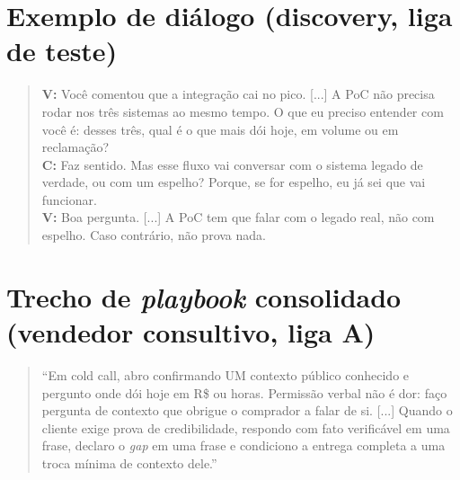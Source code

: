 \documentclass[11pt,a4paper]{article}
\begin{document}
\appendix
\section{Exemplo de diálogo (discovery, liga de teste)}
\small
\begin{quote}
\textbf{V:} Você comentou que a integração cai no pico. [...] A PoC não precisa rodar nos três sistemas ao mesmo tempo. O que eu preciso entender com você é: desses três, qual é o que mais dói hoje, em volume ou em reclamação?\\
\textbf{C:} Faz sentido. Mas esse fluxo vai conversar com o sistema legado de verdade, ou com um espelho? Porque, se for espelho, eu já sei que vai funcionar.\\
\textbf{V:} Boa pergunta. [...] A PoC tem que falar com o legado real, não com espelho. Caso contrário, não prova nada.
\end{quote}

\section{Trecho de \emph{playbook} consolidado (vendedor consultivo, liga A)}
\begin{quote}
``Em cold call, abro confirmando UM contexto público conhecido e pergunto onde dói hoje em R\$ ou horas. Permissão verbal não é dor: faço pergunta de contexto que obrigue o comprador a falar de si. [...] Quando o cliente exige prova de credibilidade, respondo com fato verificável em uma frase, declaro o \emph{gap} em uma frase e condiciono a entrega completa a uma troca mínima de contexto dele.''
\end{quote}
\end{document}
